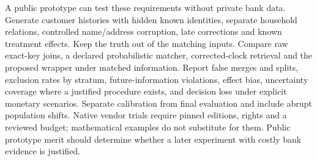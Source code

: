A public prototype can test these requirements without private bank data. Generate
customer histories with hidden known identities, separate household relations,
controlled name/address corruption, late corrections and known treatment effects.
Keep the truth out of the matching inputs. Compare raw exact-key joins, a declared
probabilistic matcher, corrected-clock retrieval and the proposed wrapper under
matched information. Report false merges and splits, exclusion rates by stratum,
future-information violations, effect bias, uncertainty coverage where a justified
procedure exists, and decision loss under explicit monetary scenarios. Separate
calibration from final evaluation and include abrupt population shifts. Native
vendor trials require pinned editions, rights and a reviewed budget; mathematical
examples do not substitute for them. Public prototype merit should determine
whether a later experiment with costly bank evidence is justified.
